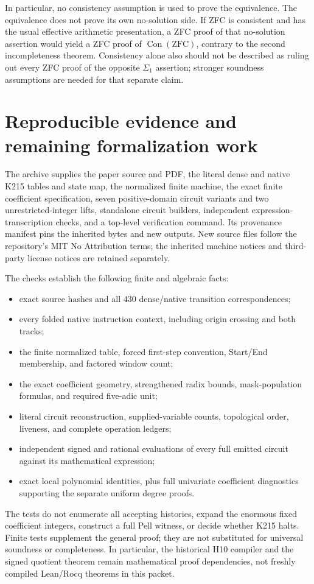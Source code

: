 \documentclass[11pt]{article}
\newcommand{\Con}{\operatorname{Con}}
\theoremstyle{remark}\newtheorem{remark}[theorem]{Remark}
\begin{document}
In particular, no consistency assumption is used to prove the equivalence. The equivalence does not prove its own no-solution side. If ZFC is consistent and has the usual effective arithmetic presentation, a ZFC proof of that no-solution assertion would yield a ZFC proof of $\Con(\mathrm{ZFC})$, contrary to the second incompleteness theorem. Consistency alone also should not be described as ruling out every ZFC proof of the opposite $\Sigma_1$ assertion; stronger soundness assumptions are needed for that separate claim.

\section{Reproducible evidence and remaining formalization work}\label{sec:evidence}

The archive supplies the paper source and PDF, the literal dense and native K215 tables and state map, the normalized finite machine, the exact finite coefficient specification, seven positive-domain circuit variants and two unrestricted-integer lifts, standalone circuit builders, independent expression-transcription checks, and a top-level verification command. Its provenance manifest pins the inherited bytes and new outputs. New source files follow the repository's MIT No Attribution terms; the inherited machine notices and third-party license notices are retained separately.

The checks establish the following finite and algebraic facts:
\begin{itemize}[nosep]
\item exact source hashes and all $430$ dense/native transition correspondences;
\item every folded native instruction context, including origin crossing and both tracks;
\item the finite normalized table, forced first-step convention, Start/End membership, and factored window count;
\item the exact coefficient geometry, strengthened radix bounds, mask-population formulas, and required five-adic unit;
\item literal circuit reconstruction, supplied-variable counts, topological order, liveness, and complete operation ledgers;
\item independent signed and rational evaluations of every full emitted circuit against its mathematical expression;
\item exact local polynomial identities, plus full univariate coefficient diagnostics supporting the separate uniform degree proofs.
\end{itemize}
The tests do not enumerate all accepting histories, expand the enormous fixed coefficient integers, construct a full Pell witness, or decide whether K215 halts. Finite tests supplement the general proof; they are not substituted for universal soundness or completeness. In particular, the historical H10 compiler and the signed quotient theorem remain mathematical proof dependencies, not freshly compiled Lean/Rocq theorems in this packet.
\end{document}
